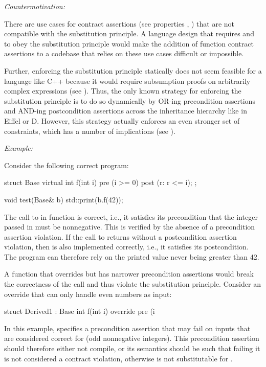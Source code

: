 \emph{Countermotivation:}

There are use cases for contract assertions (see properties , ) that are not compatible with the substitution principle. A language design that requires  and  to obey the substitution principle would make the addition of function contract assertions to a codebase that relies on these use cases difficult or impossible.

Further, enforcing the substitution principle statically does not seem feasible for a language like C++ because it would require subsumption proofs on arbitrarily complex expressions (see \cite{P3165R0}). Thus, the only known  strategy for enforcing the substitution principle is to do so dynamically by OR-ing precondition assertions and AND-ing postcondition assertions across the inheritance hierarchy like in Eiffel or D. However, this strategy actually enforces an even stronger set of constraints, which has a number of implications (see ).

\emph{Example:}

Consider the following correct program:
\begin{codeblock}
struct Base {
  virtual int f(int i)
    pre (i >= 0)
    post (r: r <= i);
};

void test(Base& b) {
  std::print(b.f(42));
}
\end{codeblock}
The call to  in function  is correct, i.e., it satisfies its precondition that the integer passed in must be nonnegative. This is verified by the absence of a precondition assertion violation. If the call to  returns without a postcondition assertion violation, then  is also implemented correctly, i.e., it satisfies its postcondition. The program can therefore rely on  the printed value never being greater than 42.

A function that overrides  but has narrower precondition assertions would break the correctness of the call and thus violate the substitution principle. Consider an override that can only handle even numbers as input:
\begin{codeblock}
struct Derived1 : Base {
  int f(int i) override
    pre (i %
}
\end{codeblock}
In this example,  specifies a precondition assertion that may fail on inputs that are considered correct for  (odd nonnegative integers). This precondition assertion should therefore either not compile, or its semantics should be such that failing it is not considered a contract violation, otherwise  is not substitutable for .

